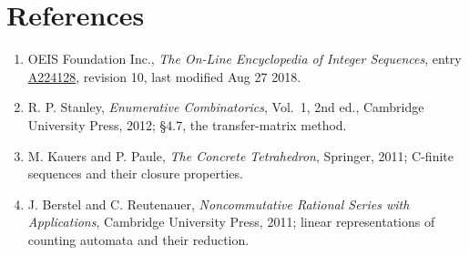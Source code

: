 \documentclass[11pt]{article}
\theoremstyle{definition}
\begin{document}
\section{References}

\begin{enumerate}

\item OEIS Foundation Inc., \emph{The On-Line Encyclopedia of Integer Sequences}, entry \href{https://oeis.org/A224128}{A224128}, revision 10, last modified Aug 27 2018.

\item R. P. Stanley, \emph{Enumerative Combinatorics}, Vol.~1, 2nd ed., Cambridge University Press, 2012; \S4.7, the transfer-matrix method.

\item M. Kauers and P. Paule, \emph{The Concrete Tetrahedron}, Springer, 2011; C-finite sequences and their closure properties.

\item J. Berstel and C. Reutenauer, \emph{Noncommutative Rational Series with Applications}, Cambridge University Press, 2011; linear representations of counting automata and their reduction.

\end{enumerate}
\end{document}
